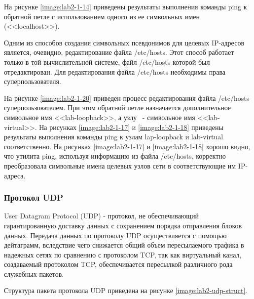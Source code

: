 	На рисунке \ref{image:lab2-1-14} приведены результаты выполнения команды ping к обратной петле с использованием одного из ее символьных имен
	(<<localhost>>).


	Одним из способов создания символьных псевдонимов для целевых IP-адресов является, очевидно, редактирование файла /etc/hosts.
	Этот способ работает только в той вычислительной системе, файл /etc/hosts которой был отредактирован.
	Для редактирования файла /etc/hosts необходимы права суперпользователя.

	На рисунке \ref{image:lab2-1-20} приведен процесс редактирования файла /etc/hosts суперпользователем. При этом обратной петле назначается дополнительное
	символьное имя <<lab-loopback>>, а узлу \virtip~- символьное имя <<lab-virtual>>. На рисунках \ref{image:lab2-1-17} и \ref{image:lab2-1-18} приведены
	результаты выполнения команды ping к узлам lap-loopback и lab-virtual соответственно. На рисунках \ref{image:lab2-1-17} и \ref{image:lab2-1-18}
	хорошо видно, что утилита ping, используя информацию из файла /etc/hosts, корректно преобразовала символьные имена целевых узлов сети в
	соответствующие им IP-адреса.


\subsubsection{Протокол UDP}

	User Datagram Protocol (UDP) - протокол, не обеспечивающий гарантированную доставку данных с сохранением порядка отправления блоков данных.
	Передача данных по протоколу UDP осуществляется	с помощью дейтаграмм, вследствие чего снижается общий объем пересылаемого трафика
	в надежных сетях по сравнению с протоколом TCP, так как виртуальный канал, создаваемый протоколом TCP,
	обеспечивается пересылкой различного рода служебных пакетов.

	Структура пакета протокола UDP приведена на рисунке \ref{image:lab2-udp-struct}.

